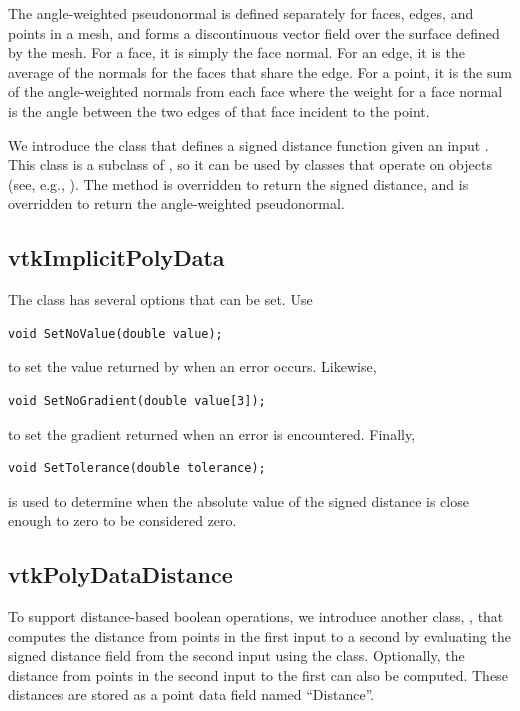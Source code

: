 \documentclass{InsightArticle}
\begin{document}
The angle-weighted pseudonormal is defined separately for faces, edges, and points in a mesh, and forms a discontinuous vector field over the surface defined by the mesh. For a face, it is simply the face normal. For an edge, it is the average of the normals for the faces that share the edge. For a point, it is the sum of the angle-weighted normals from each face where the weight for a face normal is the angle between the two edges of that face incident to the point.

We introduce the  class that defines a signed distance function given an input . This class is a subclass of , so it can be used by classes that operate on  objects (see, e.g., ). The method  is overridden to return the signed distance, and  is overridden to return the angle-weighted pseudonormal.

\subsection{vtkImplicitPolyData}

The class  has several options that can be set. Use
\begin{verbatim}
void SetNoValue(double value);
\end{verbatim}
to set the value returned by  when an error occurs. Likewise,
\begin{verbatim}
void SetNoGradient(double value[3]);
\end{verbatim}
to set the gradient returned when an error is encountered. Finally,
\begin{verbatim}
void SetTolerance(double tolerance);
\end{verbatim}
is used to determine when the absolute value of the signed distance is close enough to zero to be considered zero.

\subsection{vtkPolyDataDistance}

To support distance-based boolean operations, we introduce another class, , that computes the distance from points in the first input  to a second by evaluating the signed distance field from the second input using the  class. Optionally, the distance from points in the second input  to the first can also be computed. These distances are stored as a point data field named ``Distance''.
\end{document}

